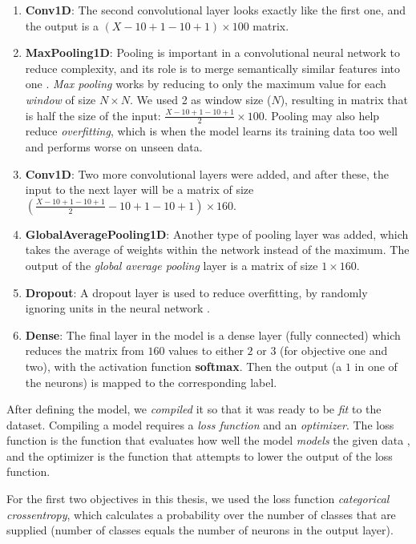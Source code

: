 \begin{enumerate}
      \item \textbf{Conv1D}: The second convolutional layer looks exactly like the first one, and the output is a $(X-10+1-10+1) \times 100$ matrix. 
      \item \textbf{MaxPooling1D}: Pooling is important in a convolutional neural network to reduce complexity, and its role is to merge semantically similar features into one \cite{deep_learning}. 
            \textit{Max pooling} works by reducing to only the maximum value for each \textit{window} of size $N \times N$. We used 2 as 
            window size ($N$), resulting in matrix that is half the size of the input: $ \frac{X-10+1-10+1}{2} \times 100$. 
            Pooling may also help reduce \textit{overfitting}, which is when the model learns its training data too well and performs worse on unseen data.
      \item \textbf{Conv1D}: Two more convolutional layers were added, and after these, the input to the next layer will be a matrix of size
            $ \left( \frac{X-10+1-10+1}{2}-10+1-10+1 \right) \times 160 $.
      \item \textbf{GlobalAveragePooling1D}: Another type of pooling layer was added, which takes the average of weights within the network instead of the maximum.
            The output of the \textit{global average pooling} layer is a matrix of size $ 1 \times 160 $.
      \item \textbf{Dropout}: A dropout layer is used to reduce overfitting, by randomly ignoring units in the neural network \cite{dropout}. 
      \item \textbf{Dense}: The final layer in the model is a dense layer (fully connected) which reduces the matrix from $160$ values to 
            either $2$ or $3$ (for objective one and two), with the activation function \textbf{softmax}. 
            Then the output (a $1$ in one of the neurons) is mapped to the corresponding label.
\end{enumerate}

After defining the model, we \textit{compiled} it so that it was ready to be \textit{fit} to the dataset. Compiling a model requires a \textit{loss function} and an \textit{optimizer}. The loss function is the function that evaluates how well the model \textit{models} the given data \cite{loss_functions}, and the optimizer is the function that attempts to lower the output of the loss function. 

For the first two objectives in this thesis, we used the loss function \textit{categorical crossentropy}, which calculates a probability over the number of classes that are supplied (number of classes equals the number of neurons in the output layer). 


